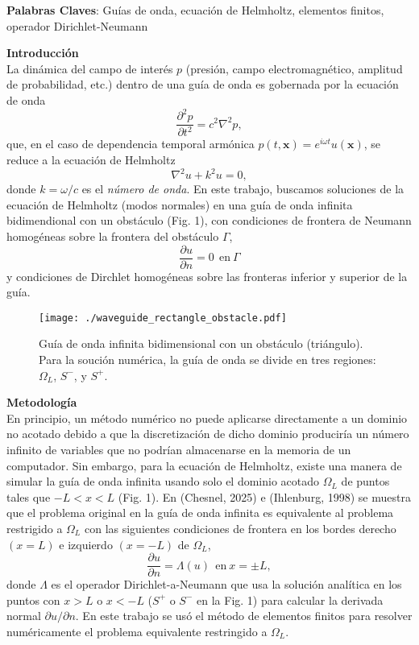 \documentclass[11pt]{article}
\begin{document}
\medskip
\noindent\textbf{Palabras Claves}: Gu\'ias de onda, ecuaci\'on de Helmholtz, elementos finitos, operador Dirichlet-Neumann

\vspace{1em}
\noindent\textbf{Introducción}\\
La din\'amica del campo de inter\'es $p$ (presi\'on, campo electromagn\'etico, amplitud de probabilidad, etc.) dentro de una gu\'ia de onda es gobernada por la ecuaci\'on de onda
\begin{equation}
  \label{eq:1}
  \frac{\partial^2 p}{\partial t^2} = c^2\nabla^2 p,
\end{equation}
que, en el caso de dependencia temporal arm\'onica $p(t,\mathbf{x}) = e^{i\omega t}u(\mathbf{x})$, se reduce a la ecuaci\'on de Helmholtz
\begin{equation}
  \label{eq:2}
  \nabla^2 u + k^2 u = 0,
\end{equation}
donde $k = \omega/c$ es el \textit{n\'umero de onda}. En este trabajo, buscamos soluciones de la ecuaci\'on de Helmholtz (modos normales) en una gu\'ia de onda infinita bidimendional con un obst\'aculo (Fig. 1), con condiciones de frontera de Neumann homog\'eneas sobre la frontera del obst\'aculo $\Gamma$,
\begin{equation}
  \label{eq:3}
  \frac{\partial u}{\partial n} = 0~~\textrm{en}~\Gamma
\end{equation}
y condiciones de Dirchlet homog\'eneas sobre las fronteras inferior y superior de la gu\'ia.
\begin{figure}[h]
  \centering
  \texttt{[image: ./waveguide\_rectangle\_obstacle.pdf]}
  \caption{Gu\'ia de onda infinita bidimensional con un obst\'aculo (tri\'angulo). Para la souci\'on num\'erica, la gu\'ia de onda se divide en tres regiones: $\Omega_L$, $S^-$, y $S^+$.} 
  \label{fig:waveguide}
\end{figure}

\vspace{1em}
\noindent\textbf{Metodolog\'ia}\\
En principio, un m\'etodo num\'erico no puede aplicarse directamente a un dominio no acotado debido a que la discretizaci\'on de dicho dominio producir\'ia un n\'umero infinito de variables que no podr\'ian almacenarse en la memoria de un computador. Sin embargo, para la ecuaci\'on de Helmholtz, existe una manera de simular la gu\'ia de onda infinita usando solo el dominio acotado $\Omega_L$ de puntos tales que $-L < x < L$ (Fig. 1). En (Chesnel, 2025) e (Ihlenburg, 1998) se muestra que el problema original en la gu\'ia de onda infinita es equivalente al problema restrigido a $\Omega_L$ con las siguientes condiciones de frontera en los bordes derecho $(x=L)$ e izquierdo $(x=-L)$ de $\Omega_L$,
\begin{equation}
  \label{eq:4}
  \frac{\partial u}{\partial n} = \Lambda(u)~~\mathrm{en}~x = \pm L,
\end{equation}
donde $\Lambda$ es el operador Dirichlet-a-Neumann que usa la soluci\'on anal\'itica en los puntos con $x>L$ o $x < -L$ ($S^+$ o $S^-$ en la Fig. 1) para calcular la derivada normal $\partial u/\partial n$. En este trabajo se us\'o el m\'etodo de elementos finitos para resolver num\'ericamente el problema equivalente restringido a $\Omega_L$.
\end{document}
